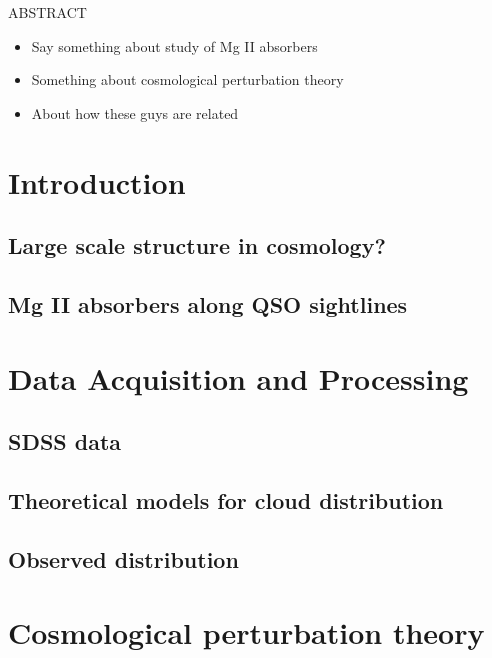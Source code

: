 \documentclass[12pt,a4paper,twoside]{book}
\begin{document}

\newpage\topskip 40pt
\thispagestyle{empty}
\centerline{\Large ABSTRACT}
\vskip 20pt\noindent 
\begin{itemize}
	\item Say something about study of Mg II absorbers
	\item Something about cosmological perturbation theory
	\item About how these guys are related
\end{itemize}


\newpage
\thispagestyle{empty}
\tableofcontents
\newpage




\chapter{Introduction}
	\section{Large scale structure in cosmology?}
	\section{Mg II absorbers along QSO sightlines}
\chapter{Data Acquisition and Processing}
	\section{SDSS data}
	\section{Theoretical models for cloud distribution}
	\section{Observed distribution}
\chapter{Cosmological perturbation theory}
\end{document}
